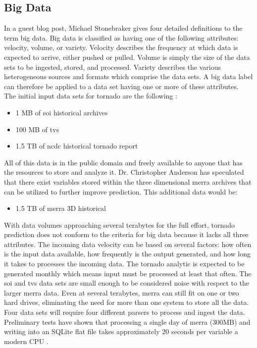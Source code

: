 \subsection{Big Data}
In a guest blog post, Michael Stonebraker gives four detailed definitions to the term big data\cite{stonebraker}.  Big data is classified as having one of the following attributes: velocity, volume, or variety.  Velocity describes the frequency at which data is expected to arrive, either pushed or pulled. Volume is simply the size of the data sets to be ingested, stored, and processed. Variety describes the various heterogeneous sources and formats which comprise the data sets. A big data label can therefore be applied to a data set having  one or more of these attributes.\\

The initial input data sets for tornado are the following \cite{walker}:
\begin{itemize}
    \item 1 MB of \gls{soi} historical archives \cite{bom}
    \item 100 MB of \gls{tvs} \cite{hdss}
    \item 1.5 TB of \gls{ncdc} historical tornado report \cite{ncdc}
\end{itemize}
All of this data is in the public domain and freely available to anyone that has the resources to store and analyze it. Dr. Christopher Anderson has speculated that there exist variables stored within the three dimensional \gls{merra} archives that can be utilized to further improve prediction. This additional data would be:
\begin{itemize}
    \item 1.5 TB of \gls{merra} 3D historical \cite{mdisc}
\end{itemize}
With data volumes approaching several terabytes for the full effort, tornado prediction does not conform to the criteria for big data because it lacks all three attributes. The incoming data velocity can be based on several factors: how often is the input data available, how frequently is the output generated, and how long it takes to processes the incoming data. The tornado analytic is expected to be generated monthly which means input must be processed at least that often. The \gls{soi} and \gls{tvs} data sets are small enough to be considered noise with respect to the larger \gls{merra} data.  Even at several terabytes, \gls{merra} can still fit on one or two hard drives, eliminating the need for more than one system to store all the data.  Four data sets will require four different parsers to process and ingest the data. Preliminary tests have shown that processing a single day of \gls{merra} (300MB) and writing into an SQLite flat file takes approximately 20 seconds per variable a modern CPU \cite{keller1}.\\

